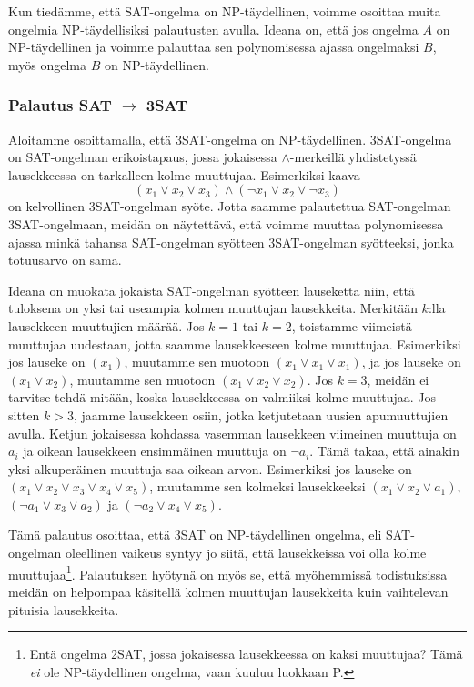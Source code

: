 Kun tiedämme, että SAT-ongelma on NP-täydellinen,
voimme osoittaa muita ongelmia NP-täydellisiksi palautusten avulla.
Ideana on, että jos ongelma $A$ on NP-täydellinen ja
voimme palauttaa sen polynomisessa ajassa ongelmaksi $B$,
myös ongelma $B$ on NP-täydellinen.

\subsubsection{Palautus SAT $\rightarrow$ 3SAT}

Aloitamme osoittamalla, että 3SAT-ongelma on NP-täydellinen.
3SAT-on\-gelma on SAT-ongelman erikoistapaus, jossa jokaisessa
$\land$-merkeillä yhdistetyssä lausekkeessa on tarkalleen kolme muuttujaa.
Esimerkiksi kaava
\[(x_1 \lor x_2 \lor x_3) \land (\neg x_1 \lor x_2 \lor \neg x_3)\]
on kelvollinen 3SAT-ongelman syöte.
Jotta saamme palautettua SAT-ongel\-man 3SAT-ongelmaan,
meidän on näytettävä, että voimme muuttaa polynomisessa ajassa
minkä tahansa SAT-ongelman syötteen 3SAT-ongelman syötteeksi,
jonka totuusarvo on sama.

Ideana on muokata jokaista SAT-ongelman syötteen lauseketta niin, 
että tuloksena on yksi tai useampia kolmen muuttujan lausekkeita.
Merkitään $k$:lla lausekkeen muuttujien määrää.
Jos $k=1$ tai $k=2$, toistamme viimeistä muuttujaa uudestaan,
jotta saamme lausekkeeseen kolme muuttujaa.
Esimerkiksi jos lauseke on $(x_1)$, muutamme sen muotoon
$(x_1 \lor x_1 \lor x_1)$, ja jos lauseke on $(x_1 \lor x_2)$, muutamme
sen muotoon $(x_1 \lor x_2 \lor x_2)$.
Jos $k=3$, meidän ei tarvitse tehdä mitään, koska lausekkeessa
on valmiiksi kolme muuttujaa. Jos sitten $k>3$,
jaamme lausekkeen osiin, jotka ketjutetaan uusien apumuuttujien avulla.
Ketjun jokaisessa kohdassa vasemman lausekkeen viimeinen
muuttuja on $a_i$ ja oikean lausekkeen ensimmäinen muuttuja on $\neg a_i$.
Tämä takaa, että ainakin yksi alkuperäinen muuttuja saa oikean arvon.
Esimerkiksi jos lauseke on $(x_1 \lor x_2 \lor x_3 \lor x_4 \lor x_5)$,
muutamme sen kolmeksi lausekkeeksi $(x_1 \lor x_2 \lor a_1)$,
$(\neg a_1 \lor x_3 \lor a_2)$ ja $(\neg a_2 \lor x_4 \lor x_5)$.

Tämä palautus osoittaa, että 3SAT on NP-täydellinen ongelma,
eli SAT-ongelman oleellinen vaikeus syntyy jo siitä, että lausekkeissa
voi olla kolme muuttujaa\footnote{Entä ongelma 2SAT, jossa jokaisessa lausekkeessa
on kaksi muuttujaa? Tämä \emph{ei} ole NP-täydellinen ongelma,
vaan kuuluu luokkaan P.}.
Palautuksen hyötynä on myös se, että myöhemmissä todistuksissa
meidän on helpompaa käsitellä kolmen muuttujan lausekkeita
kuin vaihtelevan pituisia lausekkeita.

